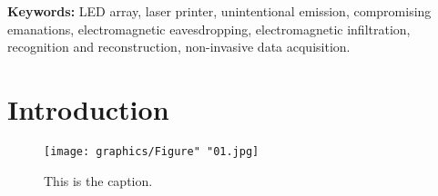 \documentclass[10pt,a4paper]{article}
\begin{document}
\title{}

\author{Ireneusz Kubiak \and Joe Loughry}

\maketitle

\doublespacing

\begin{abstract}
	
\end{abstract}

\textbf{Keywords:} LED array, laser printer, unintentional emission,
compromising emanations, electromagnetic eavesdropping, electromagnetic
infiltration, recognition and reconstruction, non-invasive data acquisition.

\section{Introduction}

\begin{figure}[!t]
    \centering
    \texttt{[image: graphics/Figure" "01.jpg]}
    \caption{This is the caption.}
    \label{figure:Figure_01}
\end{figure}

%

\singlespacing



\end{document}
